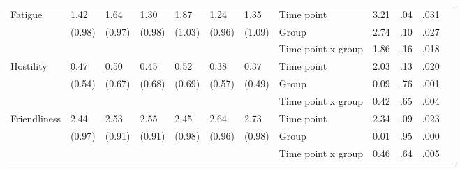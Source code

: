 \documentclass[authordate, empirical,issue]{jote-new-article}
\begin{document}
\begin{table}[th!]
\begin{fullwidth}
{\begin{tabular}{@{} l l l l l l l | l l l l l @{}}
        \hline Fatigue                                 & 1.42                                          & 1.64                 & 1.30                 & 1.87          & 1.24                                  & 1.35   & Time point         & 3.21 & .04  & .031 \\
                                                       & (0.98)                                        & (0.97)               & (0.98)               & (1.03)        & (0.96)                                & (1.09) & Group              & 2.74 & .10  & .027 \\
                                                       &                                               &                      &                      &               &                                       &        & Time point x group & 1.86 & .16  & .018 \\

        \hline Hostility                               & 0.47                                          & 0.50                 & 0.45                 & 0.52          & 0.38                                  & 0.37   & Time point         & 2.03 & .13  & .020 \\
                                                       & (0.54)                                        & (0.67)               & (0.68)               & (0.69)        & (0.57)                                & (0.49) & Group              & 0.09 & .76  & .001 \\
                                                       &                                               &                      &                      &               &                                       &        & Time point x group & 0.42 & .65  & .004 \\

        \hline Friendliness                            & 2.44                                          & 2.53                 & 2.55                 & 2.45          & 2.64                                  & 2.73   & Time point         & 2.34 & .09  & .023 \\
                                                       & (0.97)                                        & (0.91)               & (0.91)               & (0.98)        & (0.96)                                & (0.98) & Group              & 0.01 & .95  & .000 \\
                                                       &                                               &                      &                      &               &                                       &        & Time point x group & 0.46 & .64  & .005 \\


\end{tabular}}
\end{fullwidth}
\end{table}
\end{document}
